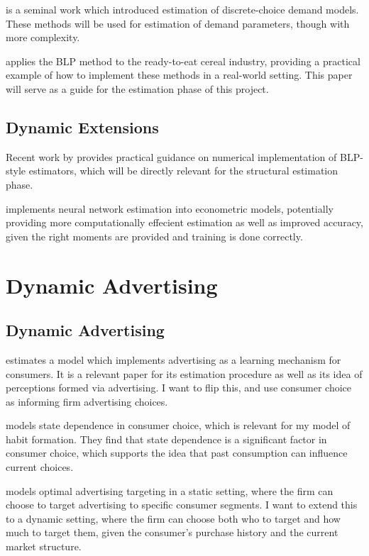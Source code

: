 \documentclass[12pt]{article}
\begin{document}
\cite{berry1995automobile} is a seminal work which introduced estimation of discrete-choice demand models. These methods will be used for estimation of demand parameters, though with more complexity.

\cite{nevo2001measuring} applies the BLP method to the ready-to-eat cereal industry, providing a practical example of how to implement these methods in a real-world setting. This paper will serve as a guide for the estimation phase of this project.

\subsection{Dynamic Extensions}


Recent work by \citet{conlon2020best} provides practical guidance on numerical
implementation of BLP-style estimators, which will be directly relevant for the
structural estimation phase.

\cite{wei2024nne} implements neural network estimation into econometric models, potentially providing more computationally effecient estimation as well as improved accuracy, given the right moments are provided and training is done correctly.

\section{Dynamic Advertising}

\subsection{Dynamic Advertising}

\cite{erdem1996brand} estimates a model which implements advertising as a learning mechanism for consumers. It is a relevant paper for its estimation procedure as well as its idea of perceptions formed via advertising. I want to flip this, and use consumer choice as informing firm advertising choices.

\cite{dube2010state} models state dependence in consumer choice, which is relevant for my model of habit formation. They find that state dependence is a significant factor in consumer choice, which supports the idea that past consumption can influence current choices.

\cite{bergemann2011targeting} models optimal advertising targeting in a static setting, where the firm can choose to target advertising to specific consumer segments. I want to extend this to a dynamic setting, where the firm can choose both who to target and how much to target them, given the consumer's purchase history and the current market structure.
\end{document}
